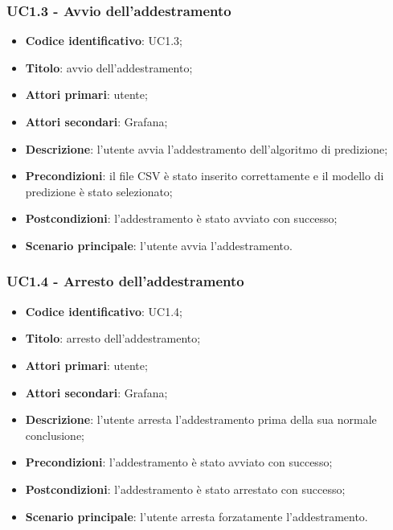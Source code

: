 \subsubsection{UC1.3 - Avvio dell'addestramento}
\begin{itemize}
	\item \textbf{Codice identificativo}: UC1.3;
	\item \textbf{Titolo}: avvio dell'addestramento;
	\item \textbf{Attori primari}: utente;
	\item \textbf{Attori secondari}: Grafana\glo;
	\item \textbf{Descrizione}: l'utente avvia l'addestramento dell'algoritmo di predizione;
	\item \textbf{Precondizioni}: il file CSV è stato inserito correttamente e il modello di predizione è stato selezionato;
	\item \textbf{Postcondizioni}: l'addestramento è stato avviato con successo;
	\item \textbf{Scenario principale}: l'utente avvia l'addestramento.
\end{itemize}

\subsubsection{UC1.4 - Arresto dell'addestramento}
\begin{itemize}
	\item \textbf{Codice identificativo}: UC1.4;
	\item \textbf{Titolo}: arresto dell'addestramento;
	\item \textbf{Attori primari}: utente;
	\item \textbf{Attori secondari}: Grafana\glo;
	\item \textbf{Descrizione}: l'utente arresta l'addestramento prima della sua normale conclusione;
	\item \textbf{Precondizioni}: l'addestramento è stato avviato con successo;
	\item \textbf{Postcondizioni}: l'addestramento è stato arrestato con successo;
	\item \textbf{Scenario principale}: l'utente arresta forzatamente l'addestramento.
\end{itemize}

